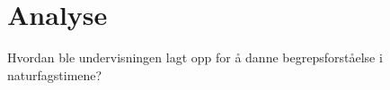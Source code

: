 \documentclass[main.tex]{subfiles}
\begin{document}
\section*{Analyse}
\label{sec:2}
Hvordan ble undervisningen lagt opp for å danne begrepsforståelse i naturfagstimene?




\end{document}
